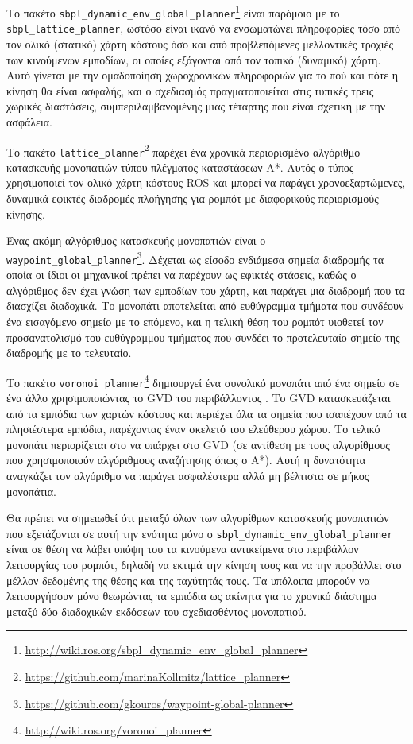 Το πακέτο
\texttt{sbpl\_dynamic\_env\_global\_planner}\footnote{\url{http://wiki.ros.org/sbpl\_dynamic\_env\_global\_planner}\cite{Phillips2011}}
είναι παρόμοιο με το \texttt{sbpl\_lattice\_planner}, ωστόσο είναι ικανό να
ενσωματώνει πληροφορίες τόσο από τον ολικό (στατικό) χάρτη κόστους όσο και από
προβλεπόμενες μελλοντικές τροχιές των κινούμενων εμποδίων, οι οποίες εξάγονται
από τον τοπικό (δυναμικό) χάρτη. Αυτό γίνεται με την ομαδοποίηση χωροχρονικών
πληροφοριών για το πού και πότε η κίνηση θα είναι ασφαλής, και ο σχεδιασμός
πραγματοποιείται στις τυπικές τρεις χωρικές διαστάσεις, συμπεριλαμβανομένης
μιας τέταρτης που είναι σχετική με την ασφάλεια.

Το πακέτο
\texttt{lattice\_planner}\footnote{\url{https://github.com/marinaKollmitz/lattice\_planner}}
παρέχει ένα χρονικά περιορισμένο αλγόριθμο κατασκευής μονοπατιών τύπου
πλέγματος καταστάσεων A*. Αυτός ο τύπος χρησιμοποιεί τον ολικό χάρτη κόστους
ROS και μπορεί να παράγει χρονοεξαρτώμενες, δυναμικά εφικτές διαδρομές
πλοήγησης για ρομπότ με διαφορικούς περιορισμούς κίνησης.

Ένας ακόμη αλγόριθμος κατασκευής μονοπατιών είναι ο
\texttt{waypoint\_global\_planner}\footnote{\url{https://github.com/gkouros/waypoint-global-planner}}.
Δέχεται ως είσοδο ενδιάμεσα σημεία διαδρομής τα οποία οι ίδιοι οι μηχανικοί
πρέπει να παρέχουν ως εφικτές στάσεις, καθώς ο αλγόριθμος δεν έχει γνώση των
εμποδίων του χάρτη, και παράγει μια διαδρομή που τα διασχίζει διαδοχικά. Το
μονοπάτι αποτελείται από ευθύγραμμα τμήματα που συνδέουν ένα εισαγόμενο σημείο
με το επόμενο, και η τελική θέση του ρομπότ υιοθετεί τον προσανατολισμό του
ευθύγραμμου τμήματος που συνδέει το προτελευταίο σημείο της
διαδρομής με το τελευταίο.


Το πακέτο
\texttt{voronoi\_planner}\footnote{\url{http://wiki.ros.org/voronoi\_planner}}
δημιουργεί ένα συνολικό μονοπάτι από ένα σημείο σε ένα άλλο χρησιμοποιώντας το
GVD του περιβάλλοντος \cite{Bhattacharya2007}. Το GVD κατασκευάζεται από τα
εμπόδια των χαρτών κόστους και περιέχει όλα τα σημεία που ισαπέχουν από τα
πλησιέστερα εμπόδια, παρέχοντας έναν σκελετό του ελεύθερου χώρου. Το τελικό
μονοπάτι περιορίζεται στο να υπάρχει στο GVD (σε αντίθεση με τους αλγορίθμους
που χρησιμοποιούν αλγόριθμους αναζήτησης όπως ο A*). Αυτή η δυνατότητα
αναγκάζει τον αλγόριθμο να παράγει ασφαλέστερα αλλά μη βέλτιστα σε μήκος
μονοπάτια.

Θα πρέπει να σημειωθεί ότι μεταξύ όλων των αλγορίθμων κατασκευής μονοπατιών που
εξετάζονται σε αυτή την ενότητα μόνο ο
\texttt{sbpl\_dynamic\_env\_global\_planner} είναι σε θέση να λάβει υπόψη του
τα κινούμενα αντικείμενα στο περιβάλλον λειτουργίας του ρομπότ, δηλαδή να
εκτιμά την κίνηση τους και να την προβάλλει στο μέλλον δεδομένης της θέσης και
της ταχύτητάς τους. Τα υπόλοιπα μπορούν να λειτουργήσουν μόνο θεωρώντας τα
εμπόδια ως ακίνητα για το χρονικό διάστημα μεταξύ δύο διαδοχικών εκδόσεων του
σχεδιασθέντος μονοπατιού.

